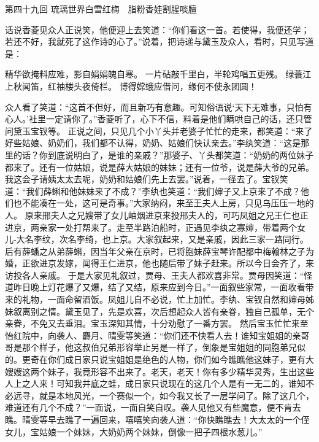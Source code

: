 \documentclass[12pt,oneside]{book}
\begin{document}
 
第四十九回  琉璃世界白雪红梅　脂粉香娃割腥啖膻


话说香菱见众人正说笑，他便迎上去笑道：“你们看这一首。若使得，我便还学；若还不好，我就死了这作诗的心了。”说着，把诗递与黛玉及众人，看时，只见写道是：

精华欲掩料应难，影自娟娟魄自寒。
一片砧敲千里白，半轮鸡唱五更残。
绿蓑江上秋闻笛，红袖楼头夜倚栏。
博得嫦蛾应借问，缘何不使永团圆！

众人看了笑道：“这首不但好，而且新巧有意趣。可知俗语说‘天下无难事，只怕有心人。’社里一定请你了。”香菱听了，心下不信，料着是他们瞒哄自己的话，还只管问黛玉宝钗等。
正说之间，只见几个小丫头并老婆子忙忙的走来，都笑道：“来了好些姑娘、奶奶们，我们都不认得，奶奶、姑娘们快认亲去。”李纨笑道：“这是那里的话？你到底说明白了，是谁的亲戚？”那婆子、丫头都笑道：“奶奶的两位妹子都来了。还有一位姑娘，说是薛大姑娘的妹妹；还有一位爷，说是薛大爷的兄弟。我这会子请姨太太去呢，奶奶和姑娘们先上去罢。”说着，一径去了。宝钗笑道：“我们薛蝌和他妹妹来了不成？”李纨也笑道：“我们婶子又上京来了不成？他们也不能凑在一处，这可是奇事。”大家纳闷，来至王夫人上房，只见乌压压一地的人。
原来邢夫人之兄嫂带了女儿岫烟进京来投邢夫人的，可巧凤姐之兄王仁也正进京，两亲家一处打帮来了。走至半路泊船时，正遇见李纨之寡婶，带着两个女儿-大名李纹，次名李绮，也上京。大家叙起来，又是亲戚，因此三家一路同行。后有薛蟠之从弟薛蝌，因当年父亲在京时，已将胞妹薛宝琴许配都中梅翰林之子为婚，正欲进京发嫁，闻得王仁进京，他也随后带了妹子赶来。所以今日会齐了，来访投各人亲戚。
于是大家见礼叙过，贾母、王夫人都欢喜非常。贾母因笑道：“怪道昨日晚上灯花爆了又爆，结了又结，原来应到今日。”一面叙些家常，一面收看带来的礼物，一面命留酒饭。凤姐儿自不必说，忙上加忙。李纨、宝钗自然和婶母姊妹叙离别之情。黛玉见了，先是欢喜，次后想起众人皆有亲眷，独自己孤单，无个亲眷，不免又去垂泪。宝玉深知其情，十分劝慰了一番方罢。
然后宝玉忙忙来至怡红院中，向袭人、麝月、晴雯等笑道：“你们还不快看人去！谁知宝姐姐的亲哥哥是那个样子，他这叔伯兄弟形容举止另是一样了，倒象是宝姐姐的同胞弟兄似的。更奇在你们成日家只说宝姐姐是绝色的人物，你们如今瞧瞧他这妹子，更有大嫂嫂这两个妹子，我竟形容不出来了。老天，老天！你有多少精华灵秀，生出这些人上之人来！可知我井底之蛙，成日家只说现在的这几个人是有一无二的，谁知不必远寻，就是本地风光，一个赛似一个，如今我又长了一层学问了。除了这几个，难道还有几个不成？”一面说，一面自笑自叹。袭人见他又有些魔意，便不肯去瞧。晴雯等早去瞧了一遍回来，嘻嘻笑向袭人道：“你快瞧瞧去！大太太的一个侄女儿，宝姑娘一个妹妹，大奶奶两个妹妹，倒像一把子四根水葱儿。”
\end{document}
